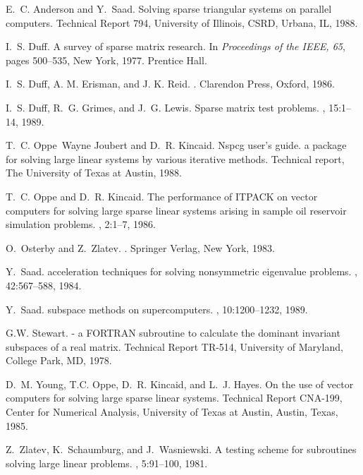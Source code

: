 \documentclass[12pt]{article}
\begin{document}
\newpage
\begin{thebibliography}{10}

E.~C. Anderson and Y.~Saad.
\newblock Solving sparse triangular systems on parallel computers.
\newblock Technical Report 794, University of Illinois, CSRD, Urbana, IL, 1988.

I.~S. Duff.
\newblock A survey of sparse matrix research.
\newblock In {\em Proceedings of the IEEE, 65}, pages 500--535, New York, 1977.
  Prentice Hall.

I.~S. Duff, {A. M. Erisman}, and {J. K. Reid}.
.
\newblock Clarendon Press, Oxford, 1986.

I.~S. Duff, R.~G. Grimes, and J.~G. Lewis.
\newblock Sparse matrix test problems.
, 15:1--14, 1989.

T.~C. Oppe~Wayne Joubert and D.~R. Kincaid.
\newblock Nspcg user's guide. a package for solving large linear systems by
  various iterative methods.
\newblock Technical report, The University of Texas at Austin, 1988.

T.~C. Oppe and D.~R. Kincaid.
\newblock The performance of {ITPACK} on vector computers for solving large
  sparse linear systems arising in sample oil reservoir simulation problems.
, 2:1--7, 1986.

O.~Osterby and Z.~Zlatev.
.
\newblock Springer Verlag, New York, 1983.

Y.~Saad.
 acceleration techniques for solving nonsymmetric
  eigenvalue problems.
, 42:567--588, 1984.

Y.~Saad.
 subspace methods on supercomputers.
, 10:1200--1232, 1989.

G.W. Stewart.
 - a FORTRAN subroutine to calculate the dominant invariant
  subspaces of a real matrix.
\newblock Technical Report TR-514, University of Maryland, College Park, MD,
  1978.

D.~M. Young, T.C. Oppe, D.~R. Kincaid, and L.~J. Hayes.
\newblock On the use of vector computers for solving large sparse linear
  systems.
\newblock Technical Report CNA-199, Center for Numerical Analysis, University
  of Texas at Austin, Austin, Texas, 1985.

Z.~Zlatev, K.~Schaumburg, and J.~Wasniewski.
\newblock A testing scheme for subroutines solving large linear problems.
, 5:91--100, 1981.

\end{thebibliography}
\end{document}
